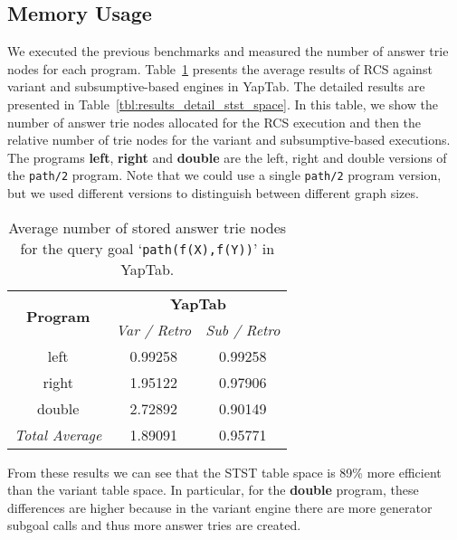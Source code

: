 

\subsection{Memory Usage}

We executed the previous benchmarks and measured the number of answer trie nodes for each program.
Table~\ref{tbl:results_average_stst_space} presents the average results of RCS against variant and
subsumptive-based engines in YapTab. The detailed results are presented in Table~\ref{tbl:results_detail_stst_space}.
In this table, we show the number of answer trie nodes allocated for the RCS execution and then the relative number
of trie nodes for the variant and subsumptive-based executions.
The programs \textbf{left}, \textbf{right} and \textbf{double} are the left, right and double versions
of the \texttt{path/2} program. Note that we could use a single \texttt{path/2} program version, but
we used different versions to distinguish between different graph sizes.

\begin{table}[ht]
\centering
  \begin{tabular}{ccc}
   \hline
    \hline
    \multirow{2}{*}{\textbf{Program}} & \multicolumn{2}{c}{\textbf{YapTab}} \\
    & \textit{\small{Var / Retro}} & \textit{\small{Sub / Retro}} \\
   \hline
   \hline
   left & 0.99258 & 0.99258 \\
   right & 1.95122 & 0.97906 \\
   double & 2.72892 & 0.90149 \\
\hline
\hline
\textit{Total Average} & 1.89091 &  0.95771 \\
\hline
\hline
\end{tabular}
\caption{Average number of stored answer trie nodes for the query goal `\texttt{path(f(X),f(Y))}' in YapTab.}
\label{tbl:results_average_stst_space}
\end{table}

From these results we can see that the STST table space is 89\% more efficient
than the variant table space. In particular, for the \textbf{double} program, these differences are higher
because in the variant engine there are more generator subgoal calls and thus more answer tries are created.



